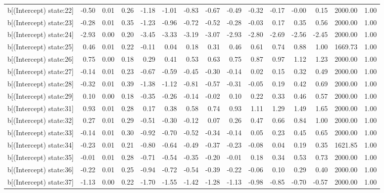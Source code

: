 \begin{table}[ht]
\begin{tabular}{rrrrrrrrrrrrrrr}
  b[(Intercept) state:22] & -0.50 & 0.01 & 0.26 & -1.18 & -1.01 & -0.83 & -0.67 & -0.49 & -0.32 & -0.17 & -0.00 & 0.15 & 2000.00 & 1.00 \\ 
  b[(Intercept) state:23] & -0.28 & 0.01 & 0.35 & -1.23 & -0.96 & -0.72 & -0.52 & -0.28 & -0.03 & 0.17 & 0.35 & 0.56 & 2000.00 & 1.00 \\ 
  b[(Intercept) state:24] & -2.93 & 0.00 & 0.20 & -3.45 & -3.33 & -3.19 & -3.07 & -2.93 & -2.80 & -2.69 & -2.56 & -2.45 & 2000.00 & 1.00 \\ 
  b[(Intercept) state:25] & 0.46 & 0.01 & 0.22 & -0.11 & 0.04 & 0.18 & 0.31 & 0.46 & 0.61 & 0.74 & 0.88 & 1.00 & 1669.73 & 1.00 \\ 
  b[(Intercept) state:26] & 0.75 & 0.00 & 0.18 & 0.29 & 0.41 & 0.53 & 0.63 & 0.75 & 0.87 & 0.97 & 1.12 & 1.23 & 2000.00 & 1.00 \\ 
  b[(Intercept) state:27] & -0.14 & 0.01 & 0.23 & -0.67 & -0.59 & -0.45 & -0.30 & -0.14 & 0.02 & 0.15 & 0.32 & 0.49 & 2000.00 & 1.00 \\ 
  b[(Intercept) state:28] & -0.32 & 0.01 & 0.39 & -1.38 & -1.12 & -0.81 & -0.57 & -0.31 & -0.05 & 0.19 & 0.42 & 0.69 & 2000.00 & 1.00 \\ 
  b[(Intercept) state:29] & 0.10 & 0.00 & 0.18 & -0.35 & -0.26 & -0.14 & -0.02 & 0.10 & 0.22 & 0.33 & 0.46 & 0.57 & 2000.00 & 1.00 \\ 
  b[(Intercept) state:31] & 0.93 & 0.01 & 0.28 & 0.17 & 0.38 & 0.58 & 0.74 & 0.93 & 1.11 & 1.29 & 1.49 & 1.65 & 2000.00 & 1.00 \\ 
  b[(Intercept) state:32] & 0.27 & 0.01 & 0.29 & -0.51 & -0.30 & -0.12 & 0.07 & 0.26 & 0.47 & 0.66 & 0.84 & 1.00 & 2000.00 & 1.00 \\ 
  b[(Intercept) state:33] & -0.14 & 0.01 & 0.30 & -0.92 & -0.70 & -0.52 & -0.34 & -0.14 & 0.05 & 0.23 & 0.45 & 0.65 & 2000.00 & 1.00 \\ 
  b[(Intercept) state:34] & -0.23 & 0.01 & 0.21 & -0.80 & -0.64 & -0.49 & -0.37 & -0.23 & -0.08 & 0.04 & 0.19 & 0.35 & 1621.85 & 1.00 \\ 
  b[(Intercept) state:35] & -0.01 & 0.01 & 0.28 & -0.71 & -0.54 & -0.35 & -0.20 & -0.01 & 0.18 & 0.34 & 0.53 & 0.73 & 2000.00 & 1.00 \\ 
  b[(Intercept) state:36] & -0.22 & 0.01 & 0.25 & -0.94 & -0.72 & -0.54 & -0.39 & -0.22 & -0.06 & 0.10 & 0.29 & 0.40 & 2000.00 & 1.00 \\ 
  b[(Intercept) state:37] & -1.13 & 0.00 & 0.22 & -1.70 & -1.55 & -1.42 & -1.28 & -1.13 & -0.98 & -0.85 & -0.70 & -0.57 & 2000.00 & 1.00 \\ 

\end{tabular}
\end{table}

